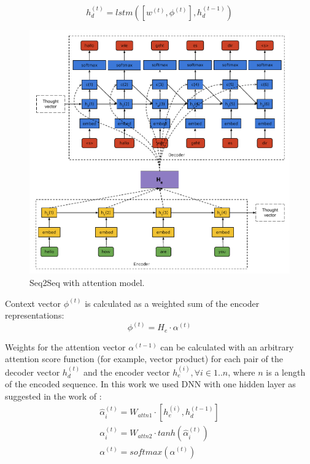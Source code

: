 \begin{equation}
h_d^{(t)} = lstm([w^{(t)}, \phi^{(t)}], h_d^{(t-1)})
\label{attn:hd}
\end{equation}

\begin{figure}
\centering
\includegraphics[width=5in]{Figures/seq2seq.pdf}
\decoRule
\caption[Seq2Seq model]{Seq2Seq with attention model.}
\label{fig:seq2seq}
\end{figure}

Context vector $\phi^{(t)}$ is calculated as a weighted sum of the encoder representations:
\begin{equation}
	\phi^{(t)} = H_e\cdot\alpha^{(t)}
	\label{attn:phi}
\end{equation}

Weights for the attention vector $\alpha^{(t-1)}$ can be calculated with an arbitrary attention score function (for example, vector product) for each pair of the decoder vector $h_d^{(t)}$ and the encoder vector $h_e^{(i)}, \forall i \in 1..n$, where $n$ is a length of the encoded sequence. In this work we used DNN with one hidden layer as suggested in the work of \cite{Bahdanau2014}:
\begin{equation}
\begin{gathered}
\hat{\alpha}_i^{(t)} = W_{attn1} \cdot [h_e^{(i)}, h_d^{(t-1)}] \\
\alpha_i^{(t)} = W_{attn2} \cdot tanh(\hat{\alpha}_{i}^{(t)}) \\
\alpha^{(t)} = softmax(\alpha^{(t)})
\end{gathered}
\label{attn:alpha}
\end{equation}

